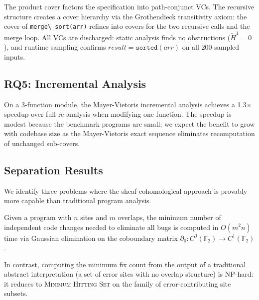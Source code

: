 \documentclass[acmsmall,screen]{acmart}
\theoremstyle{remark}
\newcommand{\Hc}[1]{\check{H}^{#1}}
\newcommand{\GF}{\mathbb{F}}
\newcommand{\py}[1]{\lstinline[language=Python]{#1}}
\begin{document}
\noindent The product cover factors the specification into
path-conjunct VCs.  The recursive structure creates a cover hierarchy
via the Grothendieck transitivity axiom: the cover of
\py{merge\_sort(arr)} refines into covers for the two recursive calls
and the merge loop.  All VCs are discharged: static analysis finds no
obstructions ($\Hc{1} = 0$), and runtime sampling confirms
$\textit{result} = \texttt{sorted}(\textit{arr})$ on all 200 sampled
inputs.

\subsection{RQ5: Incremental Analysis}

On a 3-function module, the Mayer-Vietoris incremental analysis
achieves a 1.3$\times$ speedup over full re-analysis when modifying
one function.  The speedup is modest because the benchmark programs
are small; we expect the benefit to grow with codebase size as the
Mayer-Vietoris exact sequence eliminates recomputation of unchanged
sub-covers.

\subsection{Separation Results}\label{sec:separation}

We identify three problems where the sheaf-cohomological approach is
provably more capable than traditional program analysis.

\begin{theorem}\label{thm:fix-count}
Given a program with $n$ sites and $m$ overlaps, the minimum number of
independent code changes needed to eliminate all bugs is computed in
$O(m^2 n)$ time via Gaussian elimination on the coboundary matrix
$\partial_0 : C^0(\GF_2) \to C^1(\GF_2)$.

In contrast, computing the minimum fix count from the output of a
traditional abstract interpretation (a set of error sites with
no overlap structure) is NP-hard: it reduces to \textsc{Minimum
Hitting Set} on the family of error-contributing site subsets.
\end{theorem}
\end{document}
